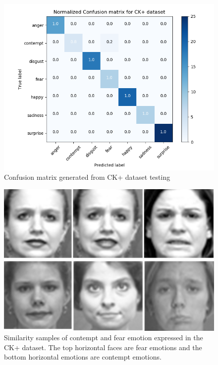 \documentclass[master]{thesis-uestc}
\begin{document}
\begin{figure}[ht]
\includegraphics[width=5in]{pic/ck+_cm.png}
\caption{Confusion matrix generated from CK+ dataset testing}
\label{ck+_cm}
\end{figure}

\begin{figure}[ht]
\includegraphics[width=5in]{pic/ck+similarity.jpg}
\caption{Similarity samples of contempt and fear emotion expressed in the CK+ dataset. The top horizontal faces are fear emotions and the bottom horizontal emotions are contempt emotions.}
\label{ck+_similarity}
\end{figure}
\end{document}

